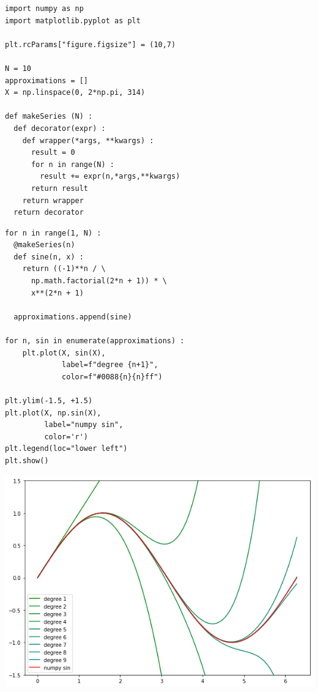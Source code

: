 
\begin{frame}[fragile]
%
\begin{tcbraster}[raster columns=2,
                  raster equal height,
                  nobeforeafter,
                  raster column skip=0.2cm]
\begin{codebox}
\begin{verbatim}
import numpy as np
import matplotlib.pyplot as plt

plt.rcParams["figure.figsize"] = (10,7)

N = 10
approximations = []
X = np.linspace(0, 2*np.pi, 314)

def makeSeries (N) :
  def decorator(expr) :
    def wrapper(*args, **kwargs) :
      result = 0
      for n in range(N) :
        result += expr(n,*args,**kwargs)
      return result
    return wrapper
  return decorator
\end{verbatim}
\end{codebox}
%
\begin{codebox}[... continued]
\begin{verbatim}
for n in range(1, N) :
  @makeSeries(n)
  def sine(n, x) :
    return ((-1)**n / \
      np.math.factorial(2*n + 1)) * \
      x**(2*n + 1)
    
  approximations.append(sine)

for n, sin in enumerate(approximations) :
    plt.plot(X, sin(X),
             label=f"degree {n+1}",
             color=f"#0088{n}{n}ff")

plt.ylim(-1.5, +1.5)
plt.plot(X, np.sin(X),
         label="numpy sin",
         color='r')
plt.legend(loc="lower left")
plt.show()
\end{verbatim}
\end{codebox}
\end{tcbraster}
%
\end{frame}


\begin{frame}
%
\begin{tcolorbox}[title=Output: Sine Series]
\begin{center}
	\includegraphics[width=.7\linewidth]{./gfx/sin-taylor}
\end{center}
\end{tcolorbox}
%
\end{frame}

